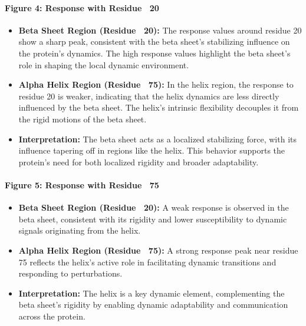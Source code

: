 \documentclass[English, Lau, oneside]{sapthesis}
\begin{document}
\begin{itemize}
\paragraph{Figure 4: Response with Residue ~20}
\begin{itemize}
    \item \textbf{Beta Sheet Region (Residue ~20):} The response values around residue 20 show a sharp peak, consistent with the beta sheet's stabilizing influence on the protein's dynamics. The high response values highlight the beta sheet’s role in shaping the local dynamic environment.
    \item \textbf{Alpha Helix Region (Residue ~75):} In the helix region, the response to residue 20 is weaker, indicating that the helix dynamics are less directly influenced by the beta sheet. The helix's intrinsic flexibility decouples it from the rigid motions of the beta sheet.
    \item \textbf{Interpretation:} The beta sheet acts as a localized stabilizing force, with its influence tapering off in regions like the helix. This behavior supports the protein's need for both localized rigidity and broader adaptability.
\end{itemize}

\paragraph{Figure 5: Response with Residue ~75}
\begin{itemize}
    \item \textbf{Beta Sheet Region (Residue ~20):} A weak response is observed in the beta sheet, consistent with its rigidity and lower susceptibility to dynamic signals originating from the helix.
    \item \textbf{Alpha Helix Region (Residue ~75):} A strong response peak near residue 75 reflects the helix's active role in facilitating dynamic transitions and responding to perturbations.
    \item \textbf{Interpretation:} The helix is a key dynamic element, complementing the beta sheet's rigidity by enabling dynamic adaptability and communication across the protein.
\end{itemize}


\end{itemize}
\end{document}
